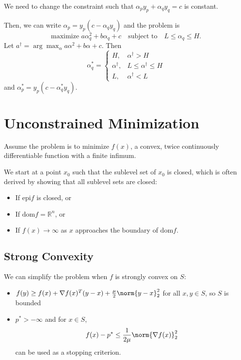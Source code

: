 \documentclass[11pt]{article}
\begin{document}
We need to change the constraint such that $\alpha_py_p + \alpha_qy_q = c$ is constant. \par

Then, we can write $\alpha_p = y_p(c - \alpha_qy_q)$ and the problem is 
\[ \text{maximize } a\alpha_q^2 + b \alpha_q + c \quad \text{subject to} \quad L \leq \alpha_q \leq H. \] 
Let $a^\dagger = \arg \max_\alpha a\alpha^2 + b\alpha + c$. Then 
\[ \alpha_q^* = \begin{cases}
    H, &\alpha^\dagger > H \\
    \alpha^\dagger, & L \leq \alpha^\dagger \leq H \\
    L, &\alpha^\dagger < L
\end{cases} \] 
and $\alpha_p^* = y_p(c - \alpha_q^*y_q)$. \par
 
\newpage 
\section{Unconstrained Minimization} 
Assume the problem is to minimize $f(x)$, a convex, twice continuously differentiable function with a finite infimum. \par 

We start at a point $x_0$ such that the sublevel set of $x_0$ is closed, which is often derived by showing that all sublevel sets are closed: 
\begin{itemize}
    \item If $\mathrm{epi} f$ is closed, or 
    \item If $\mathrm{dom} f = \mathbb{R}^n$, or 
    \item If $f(x) \rightarrow \infty$ as $x$ approaches the boundary of $\mathrm{dom} f$. 
\end{itemize}

\subsection{Strong Convexity} 
We can simplify the problem when $f$ is strongly convex on $S$: 
\begin{itemize}
    \item $f(y) \geq f(x) + \nabla f(x)^T(y - x) + \frac{\mu}{2}\norm{y - x}_2^2$ for all $x, y \in S$, so $S$ is bounded 
    \item $p^* > -\infty$ and for $x \in S$, 
    \[ f(x) - p^* \leq \frac{1}{2\mu} \norm{\nabla f(x)}_2^2 \] 
    can be used as a stopping criterion.
\end{itemize}
\end{document}

